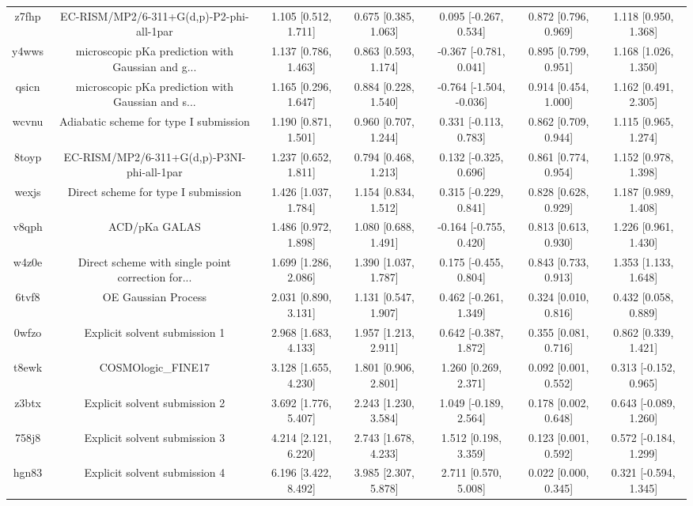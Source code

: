 \documentclass{article}
\begin{document}
\begin{center}
\begin{longtable}{|ccccccc|}
 z7fhp &           EC-RISM/MP2/6-311+G(d,p)-P2-phi-all-1par &  1.105 [0.512, 1.711] &  0.675 [0.385, 1.063] &    0.095 [-0.267, 0.534] &  0.872 [0.796, 0.969] &   1.118 [0.950, 1.368] \\
 y4wws &  microscopic pKa prediction with Gaussian and g... &  1.137 [0.786, 1.463] &  0.863 [0.593, 1.174] &   -0.367 [-0.781, 0.041] &  0.895 [0.799, 0.951] &   1.168 [1.026, 1.350] \\
 qsicn &  microscopic pKa prediction with Gaussian and s... &  1.165 [0.296, 1.647] &  0.884 [0.228, 1.540] &  -0.764 [-1.504, -0.036] &  0.914 [0.454, 1.000] &   1.162 [0.491, 2.305] \\
 wcvnu &             Adiabatic scheme for type I submission &  1.190 [0.871, 1.501] &  0.960 [0.707, 1.244] &    0.331 [-0.113, 0.783] &  0.862 [0.709, 0.944] &   1.115 [0.965, 1.274] \\
 8toyp &         EC-RISM/MP2/6-311+G(d,p)-P3NI-phi-all-1par &  1.237 [0.652, 1.811] &  0.794 [0.468, 1.213] &    0.132 [-0.325, 0.696] &  0.861 [0.774, 0.954] &   1.152 [0.978, 1.398] \\
 wexjs &                Direct scheme for type I submission &  1.426 [1.037, 1.784] &  1.154 [0.834, 1.512] &    0.315 [-0.229, 0.841] &  0.828 [0.628, 0.929] &   1.187 [0.989, 1.408] \\
 v8qph &                                      ACD/pKa GALAS &  1.486 [0.972, 1.898] &  1.080 [0.688, 1.491] &   -0.164 [-0.755, 0.420] &  0.813 [0.613, 0.930] &   1.226 [0.961, 1.430] \\
 w4z0e &  Direct scheme with single point correction for... &  1.699 [1.286, 2.086] &  1.390 [1.037, 1.787] &    0.175 [-0.455, 0.804] &  0.843 [0.733, 0.913] &   1.353 [1.133, 1.648] \\
 6tvf8 &                                OE Gaussian Process &  2.031 [0.890, 3.131] &  1.131 [0.547, 1.907] &    0.462 [-0.261, 1.349] &  0.324 [0.010, 0.816] &   0.432 [0.058, 0.889] \\
 0wfzo &                      Explicit solvent submission 1 &  2.968 [1.683, 4.133] &  1.957 [1.213, 2.911] &    0.642 [-0.387, 1.872] &  0.355 [0.081, 0.716] &   0.862 [0.339, 1.421] \\
 t8ewk &                                 COSMOlogic\_FINE17 &  3.128 [1.655, 4.230] &  1.801 [0.906, 2.801] &     1.260 [0.269, 2.371] &  0.092 [0.001, 0.552] &  0.313 [-0.152, 0.965] \\
 z3btx &                      Explicit solvent submission 2 &  3.692 [1.776, 5.407] &  2.243 [1.230, 3.584] &    1.049 [-0.189, 2.564] &  0.178 [0.002, 0.648] &  0.643 [-0.089, 1.260] \\
 758j8 &                      Explicit solvent submission 3 &  4.214 [2.121, 6.220] &  2.743 [1.678, 4.233] &     1.512 [0.198, 3.359] &  0.123 [0.001, 0.592] &  0.572 [-0.184, 1.299] \\
 hgn83 &                      Explicit solvent submission 4 &  6.196 [3.422, 8.492] &  3.985 [2.307, 5.878] &     2.711 [0.570, 5.008] &  0.022 [0.000, 0.345] &  0.321 [-0.594, 1.345] \\
\end{longtable}
\end{center}
\end{document}

